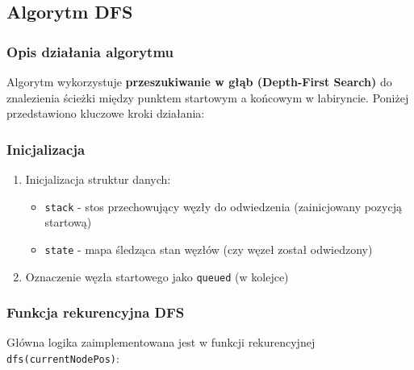 \documentclass[../../../../doc.tex]{subfiles}
\begin{document}
\subsection{Algorytm DFS}





\subsubsection{Opis działania algorytmu}

Algorytm wykorzystuje \textbf{przeszukiwanie w głąb (Depth-First Search)} do znalezienia ścieżki między punktem startowym a końcowym w labiryncie. Poniżej przedstawiono kluczowe kroki działania:

\subsubsection{Inicjalizacja}
\begin{enumerate}
  \item Inicjalizacja struktur danych:
        \begin{itemize}
          \item \texttt{stack} - stos przechowujący węzły do odwiedzenia (zainicjowany pozycją startową)
          \item \texttt{state} - mapa śledząca stan węzłów (czy węzeł został odwiedzony)
        \end{itemize}
  \item Oznaczenie węzła startowego jako \texttt{queued} (w kolejce)
\end{enumerate}

\subsubsection{Funkcja rekurencyjna DFS}
Główna logika zaimplementowana jest w funkcji rekurencyjnej \texttt{dfs(currentNodePos)}:
\end{document}
